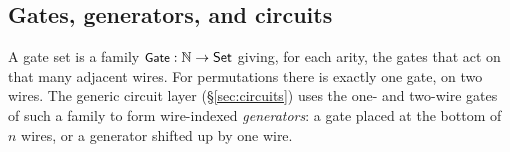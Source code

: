 \subsection{Gates, generators, and circuits}

A gate set is a family $\mbox{\textsf{\small Gate}} : \mathbb{N} \to \mathsf{Set}$ giving,
for each arity, the gates that act on that many adjacent wires.  For
permutations there is exactly one gate, on two wires.  The generic circuit
layer (\S\ref{sec:circuits}) uses the one- and two-wire gates of such a
family to form wire-indexed \emph{generators}: a gate placed at the bottom of
$n$ wires, or a
generator shifted up by one wire.

\begin{code}%
\>[0]\AgdaSpace{}%
\AgdaSpace{}%
\AgdaSymbol{:}\AgdaSpace{}%
\AgdaSpace{}%
\AgdaSpace{}%
\AgdaSpace{}%
\<%
\\
\>[0][@{}l@{\AgdaIndent{0}}]%
\>[2]\AgdaSpace{}%
\AgdaSymbol{:}\AgdaSpace{}%
\AgdaSpace{}%
\<%
\\
\>[0]\AgdaSpace{}%
\AgdaSpace{}%
\AgdaSymbol{:}\AgdaSpace{}%
\AgdaSpace{}%
\AgdaSpace{}%
\AgdaSpace{}%
\<%
\\
\>[0][@{}l@{\AgdaIndent{0}}]%
\>[2]\AgdaSpace{}%
\AgdaSymbol{:}\AgdaSpace{}%
\AgdaSpace{}%
\AgdaSpace{}%
\AgdaSpace{}%
\AgdaSpace{}%
\AgdaSymbol{(}\AgdaSpace{}%
\AgdaSymbol{)}%
\>[34]\<%
\\
%
\>[2]\AgdaSpace{}%
\AgdaSymbol{:}\AgdaSpace{}%
\AgdaSpace{}%
\AgdaSpace{}%
\AgdaSpace{}%
\AgdaSpace{}%
\AgdaSymbol{(}\AgdaSpace{}%
\AgdaSymbol{)}%
\>[34]\<%
\\
%
\>[2]%
\>[7]\AgdaSymbol{:}\AgdaSpace{}%
\AgdaSpace{}%
\AgdaSpace{}%
\AgdaSpace{}%
\AgdaSpace{}%
\AgdaSymbol{(}\AgdaSpace{}%
\AgdaSymbol{)}%
\>[34]\<%
\end{code}
